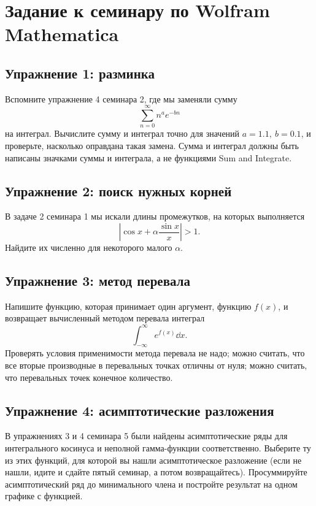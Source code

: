 \documentclass[a4paper,12pt]{article}
\author{}
\title{}
\date{\today}
\theoremstyle{plain} %
\theoremstyle{definition} %
\theoremstyle{remark} %
\begin{document}
\section*{Задание к семинару по Wolfram Mathematica}

\subsection*{Упражнение 1: разминка}
Вспомните упражнение 4 семинара 2, где мы заменяли сумму
\begin{equation}
\sum_{n=0}^{\infty} n^a e^{-bn}
\end{equation}
на интеграл. Вычислите сумму и интеграл точно для значений $a=1.1,\ b=0.1$, и проверьте, насколько оправдана такая замена. Сумма и интеграл должны быть написаны значками суммы и интеграла, а не функциями Sum and Integrate.

\subsection*{Упражнение 2: поиск нужных корней}
В задаче 2 семинара 1 мы искали длины промежутков, на которых выполняется
\begin{equation}
	\left| \cos x + \alpha \frac{\sin x}{x} \right| > 1.
\end{equation}
Найдите их численно для некоторого малого $\alpha$.

\subsection*{Упражнение 3: метод перевала}
Напишите функцию, которая принимает один аргумент, функцию $f(x)$, и возвращает вычисленный методом перевала интеграл
\begin{equation}
	\int_{-\infty}^{\infty} e^{f(x)} \dd x.
\end{equation}
Проверять условия применимости метода перевала не надо; можно считать, что все вторые производные в перевальных точках отличны от нуля; можно считать, что перевальных точек конечное количество.

\subsection*{Упражнение 4: асимптотические разложения}
В упражнениях 3 и 4 семинара 5 были найдены асимптотические ряды для интегрального косинуса и неполной гамма-функции соответственно. Выберите ту из этих функций, для которой вы нашли асимптотическое разложение (если не нашли, идите и сдайте пятый семинар, а потом возвращайтесь). Просуммируйте асимптотический ряд до минимального члена и постройте результат на одном графике с функцией. 
\end{document}
